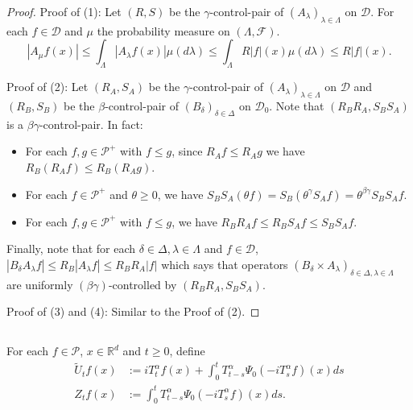 \documentclass[12pt,oneside,english]{amsart}
\theoremstyle{plain}
\theoremstyle{definition}
\numberwithin{equation}{section}
\begin{document}
\begin{proof}
    Proof of (1): Let $(R,S)$ be the $\gamma$-control-pair of $(A_\lambda)_{\lambda\in\Lambda}$ on $\mathcal{D}$. For each $f \in \mathcal{D}$ and $\mu$ the probability measure on $(\Lambda, \mathscr F)$.
\[
   |A_{\mu}f(x)|\leq \int_{\Lambda}|A_{\lambda}f(x)|\mu(d\lambda) \leq \int_{\Lambda}R|f|(x)\mu(d\lambda) \leq R|f|(x).
\]

   	Proof of (2): Let $(R_A, S_A)$ be the $\gamma$-control-pair of $(A_\lambda)_{\lambda\in\Lambda}$ on $\mathcal{D}$ and $(R_B, S_B)$ be the $\beta$-control-pair of $(B_{\delta})_{\delta\in\Delta}$ on $\mathcal{D}_0$.
	Note that $(R_BR_A, S_BS_A)$ is a $\beta \gamma$-control-pair.
	In fact:
\begin{itemize}
\item
	For each $f,g \in \mathcal P^+$ with $f\leq g$, since $R_Af \leq R_A g$ we have $R_B(R_A f)\leq R_B(R_A g)$.
\item
	For each $f\in \mathcal{P}^+$ and $\theta \geq 0$, we have $S_BS_A(\theta f)=S_B(\theta^{\gamma}S_Af)=\theta^{\beta\gamma}S_BS_Af$.
\item
	For each $f,g \in \mathcal P^+$ with $f\leq g$, we have $R_B R_A f \leq R_B S_A f \leq S_BS_A f$.
\end{itemize}
	Finally, note that for each $\delta\in \Delta, \lambda\in\Lambda$ and $f\in \mathcal D$, $|B_{\delta}A_{\lambda}f|\leq R_B|A_{\lambda}f|\leq R_BR_A|f|$ which says that operators $(B_\delta\times A_\lambda)_{\delta \in \Delta, \lambda \in \Lambda}$ are uniformly $(\beta\gamma)$-controlled by $(R_BR_A,S_BS_A)$.

   Proof of (3) and (4): Similar to the Proof of (2).
\end{proof}
\subsection{}
    For each $f \in \mathcal{P}$, $x\in \mathbb{R}^d$ and $t\geq 0$, define
\begin{align}
\label{eq: def of Zf}
    \tilde U_t f(x)
    &:= i T^\alpha_t f(x) + \int_0^t T^\alpha_{t-s} \Psi_0(-i T_s^{\alpha}f)(x)ds
    \\Z_t f (x)
    &:= \int_0^t T^\alpha_{t-s} \Psi_0(-i T_s^{\alpha}f)(x)ds.
\end{align}
\end{document}
